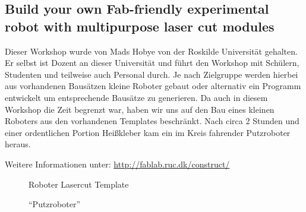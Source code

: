 \documentclass{\basedir/fablab-document}
\begin{document}
\subsection*{Build your own Fab-friendly experimental robot with multipurpose laser cut modules}

Dieser Workshop wurde von Mads Hobye von der Roskilde Universität
gehalten. Er selbst ist Dozent an dieser Universität und führt den Workshop mit
Schülern, Studenten und teilweise auch Personal durch. Je nach
Zielgruppe werden hierbei aus vorhandenen Bausätzen kleine Roboter gebaut
oder alternativ ein Programm entwickelt um entsprechende Bausätze zu
generieren. Da auch in diesem Workshop die Zeit begrenzt war, haben wir
uns auf den Bau eines kleinen Roboters aus den vorhandenen Templates
beschränkt. Nach circa 2 Stunden und einer ordentlichen Portion
Heißkleber kam ein im Kreis fahrender Putzroboter heraus.

Weitere Informationen unter: \url{http://fablab.ruc.dk/construct/}

\begin{figure}[h]
	\noindent{}
	\caption{Roboter Lasercut Template}
	\label{roboterbausatz}
\end{figure}
\begin{figure}[h]
	\noindent{}
	\caption{\enquote{Putzroboter}}
	\label{putzroboter}
\end{figure}
\end{document}
